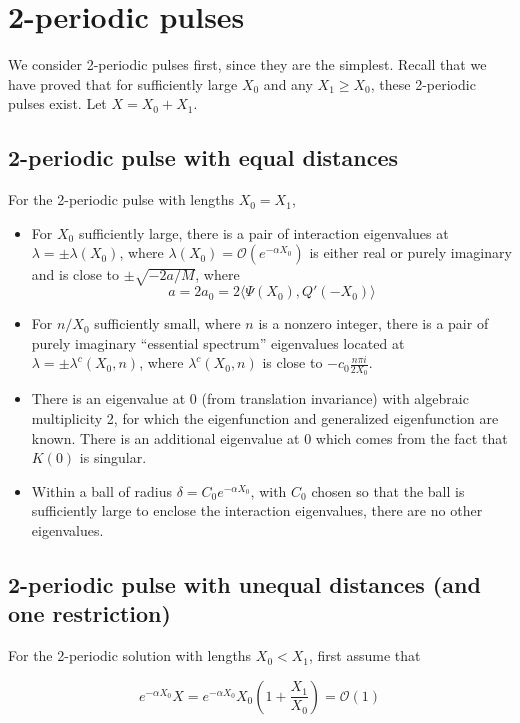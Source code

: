 \documentclass[12pt]{article}
\begin{document}
\section{2-periodic pulses}

We consider 2-periodic pulses first, since they are the simplest. Recall that we have proved that for sufficiently large $X_0$ and any $X_1 \geq X_0$, these 2-periodic pulses exist. Let $X = X_0 + X_1$.

\subsection{2-periodic pulse with equal distances}

For the 2-periodic pulse with lengths $X_0 = X_1$,

\begin{itemize}
	\item For $X_0$ sufficiently large, there is a pair of interaction eigenvalues at $\lambda = \pm \lambda(X_0)$, where $\lambda(X_0) = \mathcal{O}(e^{-\alpha X_0})$ is either real or purely imaginary and is close to $\pm \sqrt{-2a/M}$, where
	\[
	a = 2 a_0 = 2 \langle \Psi(X_0), Q'(-X_0) \rangle
	\]
	\item For $n/X_0$ sufficiently small, where $n$ is a nonzero integer, there is a pair of purely imaginary ``essential spectrum'' eigenvalues located at $\lambda = \pm \lambda^c(X_0, n)$, where $\lambda^c(X_0, n)$ is close to $-c_0 \frac{n \pi i }{2 X_0}$.
	\item There is an eigenvalue at 0 (from translation invariance) with algebraic multiplicity 2, for which the eigenfunction and generalized eigenfunction are known. There is an additional eigenvalue at 0 which comes from the fact that $K(0)$ is singular.
	\item Within a ball of radius $\delta = C_0 e^{-\alpha X_0}$, with $C_0$ chosen so that  the ball is sufficiently large to enclose the interaction eigenvalues, there are no other eigenvalues.
\end{itemize}

\subsection{2-periodic pulse with unequal distances (and one restriction)}

For the 2-periodic solution with lengths $X_0 < X_1$, first assume that

\[
e^{-\alpha X_0}X = 
e^{-\alpha X_0}X_0\left( 1 + \frac{X_1}{X_0} \right) = \mathcal{O}(1)
\]
\end{document}
